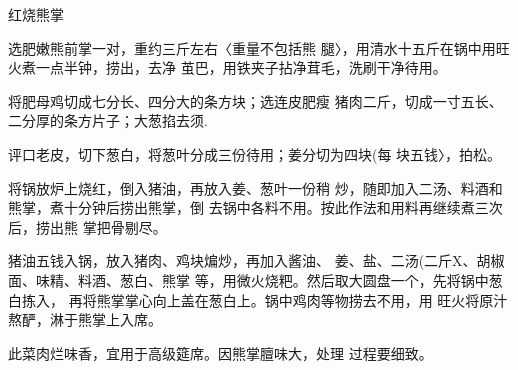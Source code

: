 \begin{recipe}{红烧熊掌}

\ingredients


\cooking

\step 	选肥嫩熊前掌一对，重约三斤左右〈重量不包括熊 腿〉，用清水十五斤在锅中用旺火煮一点半钟，捞出，去净 茧巴，用铁夹子拈净茸毛，洗刷干净待用。

\step 	将肥母鸡切成七分长、四分大的条方块；选连皮肥瘦 猪肉二斤，切成一寸五长、二分厚的条方片子；大葱掐去须.

评口老皮，切下葱白，将葱叶分成三份待用；姜分切为四块(每 块五钱〉，拍松。

\step 	将锅放炉上烧红，倒入猪油，再放入姜、葱叶一份稍 炒，随即加入二汤、料酒和熊掌，煮十分钟后捞出熊掌，倒 去锅中各料不用。按此作法和用料再继续煮三次后，捞出熊 掌把骨剔尽。

\step 	猪油五钱入锅，放入猪肉、鸡块煸炒，再加入酱油、 姜、盐、二汤(二斤X、胡椒面、味精、料酒、葱白、熊掌 等，用微火烧粑。然后取大圆盘一个，先将锅中葱白拣入， 再将熊掌掌心向上盖在葱白上。锅中鸡肉等物捞去不用，用 旺火将原汁熬酽，淋于熊掌上入席。

\notes

此菜肉烂味香，宜用于高级筵席。因熊掌膻味大，处理 过程要细致。

\end{recipe}

